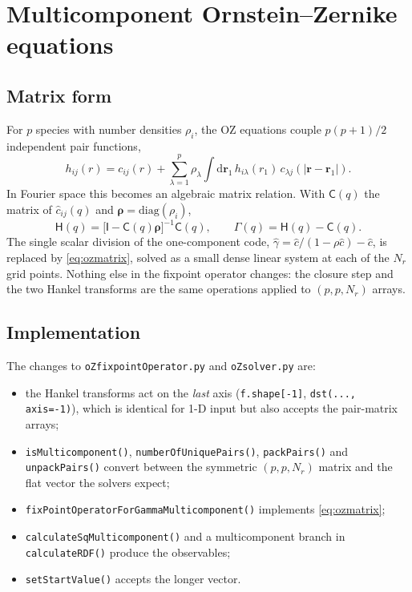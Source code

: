 \documentclass[11pt,a4paper]{article}
\newcommand{\code}[1]{\texttt{\hspace{0pt}#1}}
\begin{document}
\section{Multicomponent Ornstein--Zernike equations}

\subsection{Matrix form}

For $p$ species with number densities $\rho_i$, the OZ equations couple
$p(p+1)/2$ independent pair functions,
\begin{equation}
h_{ij}(r) = c_{ij}(r)
  + \sum_{\lambda=1}^{p}\rho_\lambda \int \mathrm{d}\mathbf{r}_1\,
    h_{i\lambda}(r_1)\,c_{\lambda j}(|\mathbf{r}-\mathbf{r}_1|).
\end{equation}
In Fourier space this becomes an algebraic matrix relation. With
$\mathsf{C}(q)$ the matrix of $\hat c_{ij}(q)$ and
$\boldsymbol{\rho}=\mathrm{diag}(\rho_i)$,
\begin{equation}
\mathsf{H}(q) = \bigl[\mathsf{I}-\mathsf{C}(q)\boldsymbol{\rho}\bigr]^{-1}
                \mathsf{C}(q),
\qquad
\mathsf{\Gamma}(q) = \mathsf{H}(q)-\mathsf{C}(q).
\label{eq:ozmatrix}
\end{equation}
The single scalar division of the one-component code,
$\hat\gamma = \hat c/(1-\rho\hat c) - \hat c$, is replaced by
\eqref{eq:ozmatrix}, solved as a small dense linear system at each of the
$N_r$ grid points. Nothing else in the fixpoint operator changes: the closure
step and the two Hankel transforms are the same operations applied to
$(p,p,N_r)$ arrays.

\subsection{Implementation}

The changes to \code{oZfixpointOperator.py} and \code{oZsolver.py} are:

\begin{itemize}[nosep]
\item the Hankel transforms act on the \emph{last} axis (\code{f.shape[-1]},
      \code{dst(...,\,axis=-1)}), which is identical for 1-D input but also
      accepts the pair-matrix arrays;
\item \code{isMulticomponent()}, \code{numberOfUniquePairs()},
      \code{packPairs()} and \code{unpackPairs()} convert between the
      symmetric $(p,p,N_r)$ matrix and the flat vector the solvers expect;
\item \code{fixPointOperatorForGammaMulticomponent()} implements
      \eqref{eq:ozmatrix};
\item \code{calculateSqMulticomponent()} and a multicomponent branch in
      \code{calculateRDF()} produce the observables;
\item \code{setStartValue()} accepts the longer vector.
\end{itemize}
\end{document}
